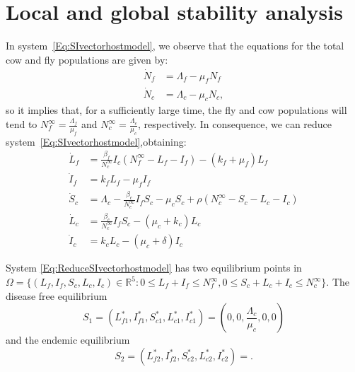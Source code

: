 \documentclass[preprint,12pt]{elsarticle}
\begin{document}
\section{Local and global stability analysis}
    In system~\ref{Eq:SIvectorhostmodel}, we observe that the equations for the 
    total cow and fly populations are given by:
\begin{equation*}
    \begin{aligned}
        \dot{N}_{f} &= \Lambda_{f} - \mu_{f}N_{f}\\
        \dot{N}_{c} &= \Lambda_{c} - \mu_{c}N_{c},
    \end{aligned}
\end{equation*}
so it implies that, for a sufficiently large time, the fly and cow populations 
will tend to $\displaystyle N_f^{\infty}=\frac{\Lambda_f}{\mu_f}$ and 
$\displaystyle N_c^{\infty}=\frac{\Lambda_c}{\mu_c}$, respectively. In 
consequence, we can reduce system~\ref{Eq:SIvectorhostmodel},obtaining:
\begin{equation}\label{Eq:ReduceSIvectorhostmodel}
\begin{aligned}
    \dot{L}_f&= 
        \frac{\beta_f}{N_c^{\infty}}I_c\left(N_f^{\infty} - L_f - 
        I_f\right)-\left(k_f+\mu_f\right)L_f
    \\
    \dot{I}_f&= 
        k_f L_f-\mu_f I_f
    \\
    \dot{S}_c&= 
        \Lambda_c-\frac{\beta_c}{N_c^{\infty}}I_fS_c-\mu_cS_c+\rho 
        \left(N_c^{\infty} - S_c - L_c - I_c\right)
    \\
    \dot{L}_c&= 
        \frac{\beta_c}{N_c^{\infty}}I_fS_c-\left(\mu_c+k_c\right)L_c
    \\
    \dot{I}_c&= k_c L_c-\left(\mu_c +\delta\right)I_c
\end{aligned}
\end{equation}

System \ref{Eq:ReduceSIvectorhostmodel} has two equilibrium points in 
$
    \Omega = 
        \{
            \left(
                L_{f}, I_{f}, S_{c}, L_{c}, I_{c}
            \right)
            \in 
            \mathbb{R}^{5}: 0\leq L_{f} + I_{f}
            \leq N_{f}^{\infty}, 
            0\leq S_{c} + L_{c} + I_{c}\leq N_{c}^{\infty}
        \}$. 
        The disease free equilibrium 
$$
    S_1 = 
        \left(
            L_{f1} ^ *, I_{f1} ^ *, S_{c1} ^ *, L_{c1} ^ *, I_{c1} ^ *
        \right) = 
    \left(0, 0, \frac{\Lambda_c}{\mu_c}, 0, 0\right)
$$ 
and the endemic equilibrium 
$$
    S_2 = (L_{f2} ^ *, I_{f2} ^ *, S_{c2} ^ *, L_{c2} ^ *, I_{c2} ^ *) = 
    .
$$
\end{document}

